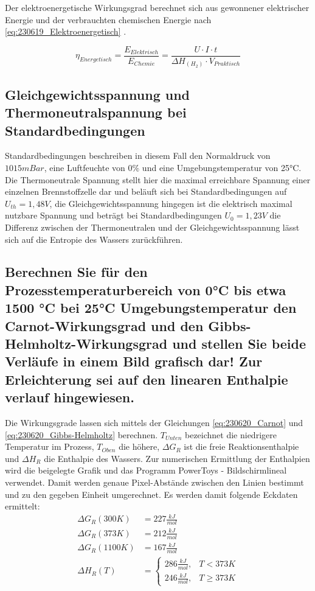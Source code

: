 Der elektroenergetische Wirkungsgrad berechnet sich aus gewonnener elektrischer Energie und der verbrauchten chemischen Energie nach \autoref{eq:230619_Elektroenergetisch} \cite{BZ-Folien}.

\begin{equation}
    \eta_{Energetisch} = \frac{E_{Elektrisch}}{E_{Chemie}} = \frac{U \cdot I \cdot t}{\Delta H_{(H_2)} \cdot V_{Praktisch}}
    \label{eq:230619_Elektroenergetisch}
\end{equation}

\subsection{Gleichgewichtsspannung und Thermoneutralspannung bei Standardbedingungen}

Standardbedingungen beschreiben in diesem Fall den Normaldruck von $1015mBar$, eine Luftfeuchte von $0\%$ und eine Umgebungstemperatur von 25°C.
Die Thermoneutrale Spannung stellt hier die maximal erreichbare Spannung einer einzelnen Brennstoffzelle dar und beläuft sich bei Standardbedingungen auf $U_{th} = 1,48V$, 
die Gleichgewichtsspannung hingegen ist die elektrisch maximal nutzbare Spannung und beträgt bei Standardbedingungen $U_0 = 1,23V$ die Differenz zwischen der Thermoneutralen und der Gleichgewichtsspannung lässt sich auf die Entropie des Wassers zurückführen.   

\subsection{Berechnen Sie für den Prozesstemperaturbereich von 0°C bis etwa 1500 °C bei 25°C
Umgebungstemperatur den Carnot-Wirkungsgrad und den Gibbs-Helmholtz-Wirkungsgrad
und stellen Sie beide Verläufe in einem Bild grafisch dar! Zur Erleichterung sei auf den
linearen Enthalpie verlauf hingewiesen.}

Die Wirkungsgrade lassen sich mittels der Gleichungen \ref{eq:230620_Carnot} und \ref{eq:230620_Gibbs-Helmholtz} berechnen. 
$T_{Unten}$ bezeichnet die niedrigere Temperatur im Prozess, $T_{Oben}$ die höhere, $\Delta G_R$ ist die freie Reaktionsenthalpie und $\Delta H_R$ die Enthalpie des Wassers.
Zur numerischen Ermittlung der Enthalpien wird die beigelegte Grafik und das Programm PowerToys - Bildschirmlineal verwendet.
Damit werden genaue Pixel-Abstände zwischen den Linien bestimmt und zu den gegeben Einheit umgerechnet.
Es werden damit folgende Eckdaten ermittelt:
\begin{align}
    \Delta G_R(300K) &= 227 \frac{kJ}{mol} \nonumber\\
    \Delta G_R(373K) &= 212 \frac{kJ}{mol} \nonumber\\
    \Delta G_R(1100K) &= 167 \frac{kJ}{mol} \nonumber\\
    \Delta H_R(T) &= 
        \begin{cases}
            286 \frac{kJ}{mol}, & T < 373 K \\
            246 \frac{kJ}{mol}, & T \geq 373 K
        \end{cases} \nonumber
\end{align}


